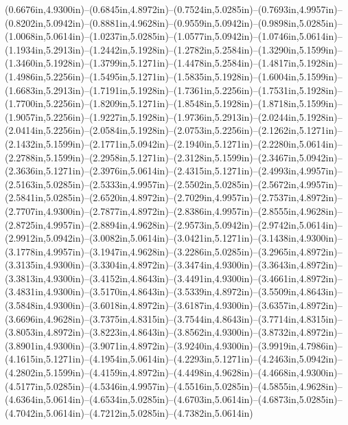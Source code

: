 (0.6676in,4.9300in)--(0.6845in,4.8972in)--(0.7524in,5.0285in)--(0.7693in,4.9957in)--(0.8202in,5.0942in)--(0.8881in,4.9628in)--(0.9559in,5.0942in)--(0.9898in,5.0285in)--(1.0068in,5.0614in)--(1.0237in,5.0285in)--(1.0577in,5.0942in)--(1.0746in,5.0614in)--(1.1934in,5.2913in)--(1.2442in,5.1928in)--(1.2782in,5.2584in)--(1.3290in,5.1599in)--(1.3460in,5.1928in)--(1.3799in,5.1271in)--(1.4478in,5.2584in)--(1.4817in,5.1928in)--(1.4986in,5.2256in)--(1.5495in,5.1271in)--(1.5835in,5.1928in)--(1.6004in,5.1599in)--(1.6683in,5.2913in)--(1.7191in,5.1928in)--(1.7361in,5.2256in)--(1.7531in,5.1928in)--(1.7700in,5.2256in)--(1.8209in,5.1271in)--(1.8548in,5.1928in)--(1.8718in,5.1599in)--(1.9057in,5.2256in)--(1.9227in,5.1928in)--(1.9736in,5.2913in)--(2.0244in,5.1928in)--(2.0414in,5.2256in)--(2.0584in,5.1928in)--(2.0753in,5.2256in)--(2.1262in,5.1271in)--(2.1432in,5.1599in)--(2.1771in,5.0942in)--(2.1940in,5.1271in)--(2.2280in,5.0614in)--(2.2788in,5.1599in)--(2.2958in,5.1271in)--(2.3128in,5.1599in)--(2.3467in,5.0942in)--(2.3636in,5.1271in)--(2.3976in,5.0614in)--(2.4315in,5.1271in)--(2.4993in,4.9957in)--(2.5163in,5.0285in)--(2.5333in,4.9957in)--(2.5502in,5.0285in)--(2.5672in,4.9957in)--(2.5841in,5.0285in)--(2.6520in,4.8972in)--(2.7029in,4.9957in)--(2.7537in,4.8972in)--(2.7707in,4.9300in)--(2.7877in,4.8972in)--(2.8386in,4.9957in)--(2.8555in,4.9628in)--(2.8725in,4.9957in)--(2.8894in,4.9628in)--(2.9573in,5.0942in)--(2.9742in,5.0614in)--(2.9912in,5.0942in)--(3.0082in,5.0614in)--(3.0421in,5.1271in)--(3.1438in,4.9300in)--(3.1778in,4.9957in)--(3.1947in,4.9628in)--(3.2286in,5.0285in)--(3.2965in,4.8972in)--(3.3135in,4.9300in)--(3.3304in,4.8972in)--(3.3474in,4.9300in)--(3.3643in,4.8972in)--(3.3813in,4.9300in)--(3.4152in,4.8643in)--(3.4491in,4.9300in)--(3.4661in,4.8972in)--(3.4831in,4.9300in)--(3.5170in,4.8643in)--(3.5339in,4.8972in)--(3.5509in,4.8643in)--(3.5848in,4.9300in)--(3.6018in,4.8972in)--(3.6187in,4.9300in)--(3.6357in,4.8972in)--(3.6696in,4.9628in)--(3.7375in,4.8315in)--(3.7544in,4.8643in)--(3.7714in,4.8315in)--(3.8053in,4.8972in)--(3.8223in,4.8643in)--(3.8562in,4.9300in)--(3.8732in,4.8972in)--(3.8901in,4.9300in)--(3.9071in,4.8972in)--(3.9240in,4.9300in)--(3.9919in,4.7986in)--(4.1615in,5.1271in)--(4.1954in,5.0614in)--(4.2293in,5.1271in)--(4.2463in,5.0942in)--(4.2802in,5.1599in)--(4.4159in,4.8972in)--(4.4498in,4.9628in)--(4.4668in,4.9300in)--(4.5177in,5.0285in)--(4.5346in,4.9957in)--(4.5516in,5.0285in)--(4.5855in,4.9628in)--(4.6364in,5.0614in)--(4.6534in,5.0285in)--(4.6703in,5.0614in)--(4.6873in,5.0285in)--(4.7042in,5.0614in)--(4.7212in,5.0285in)--(4.7382in,5.0614in)
